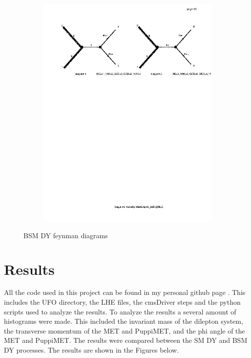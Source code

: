 \documentclass{CUP-JNL-DTM}%
\theoremstyle{definition}
\numberwithin{equation}{section}
\begin{document}
\begin{figure}[H]
\begin{subfigure}{.5\textwidth}
    \includegraphics[width=1\linewidth]{img/bsm_dy_diag2.jpg}
    \label{fig:bsm_dy2}
  \end{subfigure}
  \caption{BSM DY feynman diagrams}
  \label{fig:bsm_dy}
\end{figure}



\section{Results}
All the code used in this project can be found in my personal github page \cite{jose8afHEPProject}. This includes the UFO directory, the LHE files, the cmsDriver steps and the python scripts used to analyze the results. 
To analyze the results a several amount of histograms were made. This included the invariant mass of the dilepton system, the transverse momentum of the MET and PuppiMET, and the phi angle of the MET and PuppiMET. The results were compared between the SM DY and BSM DY processes. The results are shown in the Figures below. 
\end{document}

